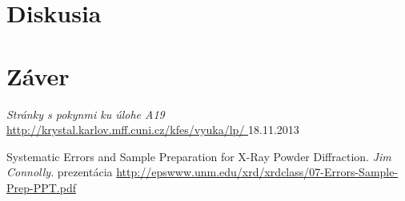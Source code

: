 \documentclass[a4paper, 10pt]{article}
\begin{document}
\section*{Diskusia}

\section*{Záver}

\begin{thebibliography}{9}

    \emph{Stránky s pokynmi ku úlohe A19} \\
    \url{http://krystal.karlov.mff.cuni.cz/kfes/vyuka/lp/
} 18.11.2013

    Systematic Errors and Sample Preparation for X-Ray Powder Diffraction.  \textit{Jim Connolly}. prezentácia
    \url{http://epswww.unm.edu/xrd/xrdclass/07-Errors-Sample-Prep-PPT.pdf}


\end{thebibliography}
\end{document}
